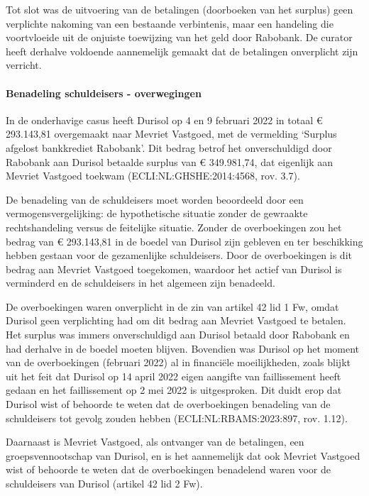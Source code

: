 \documentclass[
  dutch,
  a4paper,
]{article}
\begin{document}
Tot slot was de uitvoering van de betalingen (doorboeken van het surplus) geen verplichte nakoming van een bestaande verbintenis, maar een handeling die voortvloeide uit de onjuiste toewijzing van het geld door Rabobank. De curator heeft derhalve voldoende aannemelijk gemaakt dat de betalingen onverplicht zijn verricht.

\paragraph{Benadeling schuldeisers - overwegingen}\label{benadeling-schuldeisers---overwegingen-12}

In de onderhavige casus heeft Durisol op 4 en 9 februari 2022 in totaal € 293.143,81 overgemaakt naar Mevriet Vastgoed, met de vermelding `Surplus afgelost bankkrediet Rabobank'. Dit bedrag betrof het onverschuldigd door Rabobank aan Durisol betaalde surplus van € 349.981,74, dat eigenlijk aan Mevriet Vastgoed toekwam (ECLI:NL:GHSHE:2014:4568, rov. 3.7).

De benadeling van de schuldeisers moet worden beoordeeld door een vermogensvergelijking: de hypothetische situatie zonder de gewraakte rechtshandeling versus de feitelijke situatie. Zonder de overboekingen zou het bedrag van € 293.143,81 in de boedel van Durisol zijn gebleven en ter beschikking hebben gestaan voor de gezamenlijke schuldeisers. Door de overboekingen is dit bedrag aan Mevriet Vastgoed toegekomen, waardoor het actief van Durisol is verminderd en de schuldeisers in het algemeen zijn benadeeld.

De overboekingen waren onverplicht in de zin van artikel 42 lid 1 Fw, omdat Durisol geen verplichting had om dit bedrag aan Mevriet Vastgoed te betalen. Het surplus was immers onverschuldigd aan Durisol betaald door Rabobank en had derhalve in de boedel moeten blijven. Bovendien was Durisol op het moment van de overboekingen (februari 2022) al in financiële moeilijkheden, zoals blijkt uit het feit dat Durisol op 14 april 2022 eigen aangifte van faillissement heeft gedaan en het faillissement op 2 mei 2022 is uitgesproken. Dit duidt erop dat Durisol wist of behoorde te weten dat de overboekingen benadeling van de schuldeisers tot gevolg zouden hebben (ECLI:NL:RBAMS:2023:897, rov. 1.12).

Daarnaast is Mevriet Vastgoed, als ontvanger van de betalingen, een groepsvennootschap van Durisol, en is het aannemelijk dat ook Mevriet Vastgoed wist of behoorde te weten dat de overboekingen benadelend waren voor de schuldeisers van Durisol (artikel 42 lid 2 Fw).
\end{document}
